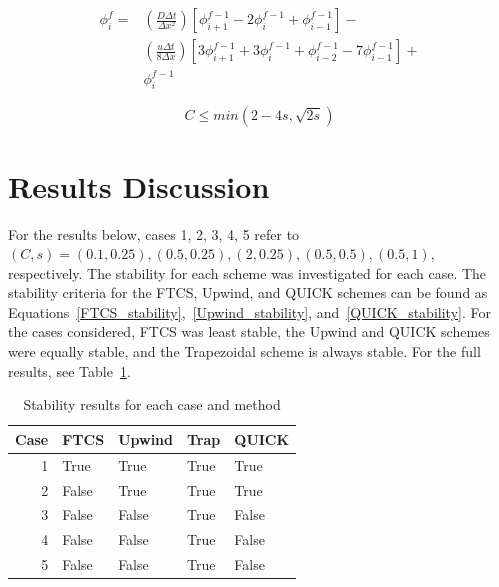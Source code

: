 \documentclass[twocolumn,10pt]{asme2ej}
\begin{document}
\begin{equation}
\label{quick_eqn}
\begin{split}
\phi_i ^f = & \left( \frac{D \Delta t}{\Delta x^2} \right) \left[ \phi_{i+1} ^{f-1} - 2 \phi_{i} ^{f-1} + \phi_{i-1} ^{f-1} \right] - \\
            & \left( \frac{u \Delta t}{8 \Delta x} \right) \left[ 3 \phi_{i+1} ^{f-1}  + 3 \phi_{i} ^{f-1}  + \phi_{i-2} ^{f-1} - 7 \phi_{i-1} ^{f-1} \right] + \\
            & \phi_i ^{f-1}
\end{split}
\end{equation}

\begin{equation}
\label{QUICK_stability}
C \leq min(2 - 4 s, \sqrt{2s})
\end{equation}

\section{Results Discussion}

For the results below, cases 1, 2, 3, 4, 5 refer to $(C, s) = (0.1, 0.25), (0.5, 0.25), (2, 0.25), (0.5, 0.5), (0.5, 1)$, respectively. The stability for each scheme was investigated for each case. The stability criteria for the FTCS, Upwind, and QUICK schemes can be found as Equations~\ref{FTCS_stability},~\ref{Upwind_stability}, and~\ref{QUICK_stability}. For the cases considered, FTCS was least stable, the Upwind and QUICK schemes were equally stable, and the Trapezoidal scheme is always stable. For the full results, see Table~\ref{stability_table}.

\begin{table}[htb]
\begin{center}
\begin{tabular}{|r | l l l l|}
\hline
Case & FTCS & Upwind & Trap & QUICK  \\
\hline
1 & True  & True  & True & True  \\
2 & False & True  & True & True  \\
3 & False & False & True & False \\
4 & False & False & True & False \\
5 & False & False & True & False \\
\hline
\end{tabular}
\caption{Stability results for each case and method}
\label{stability_table}
\end{center}
\end{table}
\end{document}
